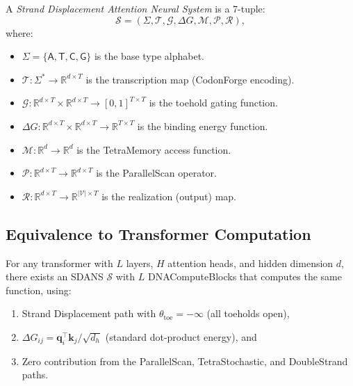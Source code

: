 \begin{dogmadef}[SDANS]
A \emph{Strand Displacement Attention Neural System} is a 7-tuple:
\begin{equation}
\mathcal{S} = (\Sigma, \mathcal{T}, \mathcal{G}, \Delta G, \mathcal{M}, \mathcal{P}, \mathcal{R}),
\label{eq:sdans-def}
\end{equation}
where:
\begin{itemize}[leftmargin=1.5em]
  \item $\Sigma = \{\mathsf{A}, \mathsf{T}, \mathsf{C}, \mathsf{G}\}$ is the base type alphabet.
  \item $\mathcal{T}: \Sigma^* \to \mathbb{R}^{d \times T}$ is the transcription map (CodonForge encoding).
  \item $\mathcal{G}: \mathbb{R}^{d \times T} \times \mathbb{R}^{d \times T} \to [0,1]^{T \times T}$ is the toehold gating function.
  \item $\Delta G: \mathbb{R}^{d \times T} \times \mathbb{R}^{d \times T} \to \mathbb{R}^{T \times T}$ is the binding energy function.
  \item $\mathcal{M}: \mathbb{R}^d \to \mathbb{R}^d$ is the TetraMemory access function.
  \item $\mathcal{P}: \mathbb{R}^{d \times T} \to \mathbb{R}^{d \times T}$ is the ParallelScan operator.
  \item $\mathcal{R}: \mathbb{R}^{d \times T} \to \mathbb{R}^{|\mathcal{V}| \times T}$ is the realization (output) map.
\end{itemize}
\end{dogmadef}

\subsection{Equivalence to Transformer Computation}

\begin{theorem}
\label{thm:sdans-expressiveness}
For any transformer with $L$ layers, $H$ attention heads, and hidden dimension $d$, there exists an SDANS $\mathcal{S}$ with $L$ DNAComputeBlocks that computes the same function, using:
\begin{enumerate}[leftmargin=1.5em]
  \item Strand Displacement path with $\theta_{\mathrm{toe}} = -\infty$ (all toeholds open),
  \item $\Delta G_{ij} = \mathbf{q}_i^\top \mathbf{k}_j / \sqrt{d_h}$ (standard dot-product energy), and
  \item Zero contribution from the ParallelScan, TetraStochastic, and DoubleStrand paths.
\end{enumerate}
\end{theorem}

